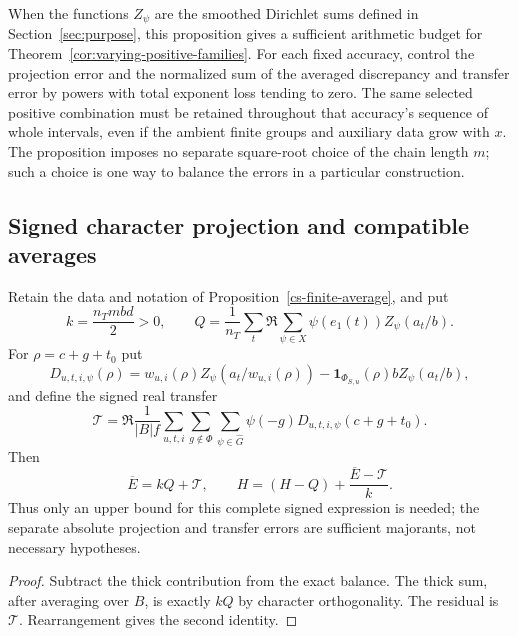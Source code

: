 When the functions $Z_\psi$ are the smoothed Dirichlet sums defined in
Section~\ref{sec:purpose}, this proposition gives a sufficient arithmetic
budget for Theorem~\ref{cor:varying-positive-families}. For each fixed
accuracy, control the projection error and the normalized sum of the
averaged discrepancy and transfer error by powers with total exponent
loss tending to zero. The same selected positive combination must be
retained throughout that accuracy's sequence of whole intervals, even
if the ambient finite groups and auxiliary data grow with $x$.
The proposition imposes no separate square-root choice of the chain
length $m$; such a choice is one way to balance the errors in a particular
construction.

\subsection{Signed character projection and compatible averages}

\begin{proposition}\label{cs-signed-budget}
Retain the data and notation of Proposition~\ref{cs-finite-average}, and put
\[
 k=\frac{n_Tmbd}{2}>0,\qquad
 Q=\frac1{n_T}\sum_t\Re\sum_{\psi\in X}
          \psi(e_1(t))Z_\psi(a_t/b).
\]
For $\rho=c+g+t_0$ put
\[
 D_{u,t,i,\psi}(\rho)=w_{u,i}(\rho)Z_\psi(a_t/w_{u,i}(\rho))
       -\mathbf1_{\Phi_{S,u}}(\rho)bZ_\psi(a_t/b),
\]
and define the signed real transfer
\[
 \mathcal T=\Re\frac1{|B|f}\sum_{u,t,i}\sum_{g\notin\Phi}
           \sum_{\psi\in\widehat G}\psi(-g)
                        D_{u,t,i,\psi}(c+g+t_0).
\]
Then
\[
 \overline E=kQ+\mathcal T,\qquad
 H=(H-Q)+\frac{\overline E-\mathcal T}{k}.
\]
Thus only an upper bound for this complete signed expression is needed;
the separate absolute projection and transfer errors are sufficient
majorants, not necessary hypotheses.
\end{proposition}
\begin{proof}
Subtract the thick contribution from the exact balance. The thick sum,
after averaging over $B$, is exactly $kQ$ by character orthogonality.
The residual is $\mathcal T$. Rearrangement gives the second identity.
\end{proof}

